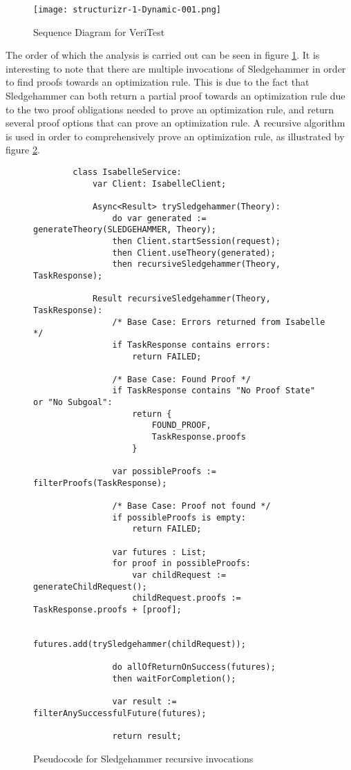 \begin{figure}[ht]
    \centering
    \texttt{[image: structurizr-1-Dynamic-001.png]}
    \caption{Sequence Diagram for VeriTest}
    \label{fig:sequenceDiagram}
\end{figure}

The order of which the analysis is carried out can be seen in figure \ref{fig:sequenceDiagram}. It is interesting to note that there are 
multiple invocations of Sledgehammer in order to find proofs towards an optimization rule. This is due to the fact that Sledgehammer can both 
return a partial proof towards an optimization rule due to the two proof obligations needed to prove an optimization rule, and return several 
proof options that can prove an optimization rule. A recursive algorithm is used in order to comprehensively prove an optimization rule, 
as illustrated by figure \ref{fig:sledgehammerPseudocode}.

\begin{figure}[h]
    \begin{lstlisting}
        class IsabelleService:
            var Client: IsabelleClient;
            
            Async<Result> trySledgehammer(Theory):
                do var generated := generateTheory(SLEDGEHAMMER, Theory);
                then Client.startSession(request);
                then Client.useTheory(generated);
                then recursiveSledgehammer(Theory, TaskResponse);
            
            Result recursiveSledgehammer(Theory, TaskResponse):
                /* Base Case: Errors returned from Isabelle */
                if TaskResponse contains errors:
                    return FAILED;
                
                /* Base Case: Found Proof */
                if TaskResponse contains "No Proof State" or "No Subgoal":
                    return {
                        FOUND_PROOF,
                        TaskResponse.proofs
                    }
                
                var possibleProofs := filterProofs(TaskResponse);

                /* Base Case: Proof not found */
                if possibleProofs is empty:
                    return FAILED;
                
                var futures : List;
                for proof in possibleProofs:
                    var childRequest := generateChildRequest();
                    childRequest.proofs := TaskResponse.proofs + [proof];

                    futures.add(trySledgehammer(childRequest));
                
                do allOfReturnOnSuccess(futures);
                then waitForCompletion();

                var result := filterAnySuccessfulFuture(futures);

                return result;
    \end{lstlisting}

    \caption{Pseudocode for Sledgehammer recursive invocations}
    \label{fig:sledgehammerPseudocode}
\end{figure}

